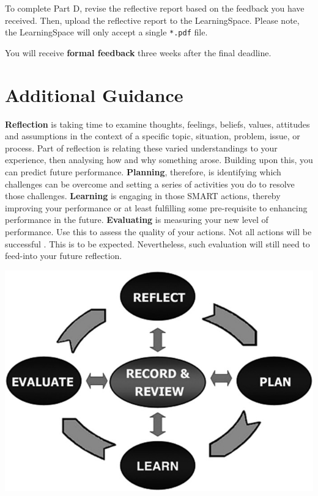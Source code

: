 \documentclass{../fal_assignment}
\begin{document}
To complete Part D, revise the reflective report based on the feedback you have received. Then, upload the reflective report to the LearningSpace. Please note, the LearningSpace will only accept a single \texttt{*.pdf} file.

You will receive \textbf{formal feedback} three weeks after the final deadline.

\section*{Additional Guidance}

\textbf{Reflection} is taking time to examine thoughts, feelings, beliefs, values, attitudes and assumptions in the context of a specific topic, situation, problem, issue, or process. Part of reflection is relating these varied understandings to your experience, then analysing how and why something arose. Building upon this, you can predict future performance. \textbf{Planning}, therefore, is identifying which challenges can be overcome and setting a series of activities you do to resolve those challenges. \textbf{Learning} is engaging in those SMART actions, thereby improving your performance or at least fulfilling some pre-requisite to enhancing performance in the future. \textbf{Evaluating} is measuring your new level of performance. Use this to assess the quality of your actions. Not all actions will be successful . This is to be expected. Nevertheless, such evaluation will still need to feed-into your future reflection.

\begin{center}
    \includegraphics[scale=3]{ajpe798112-fig1} 
\end{center}
\end{document}
